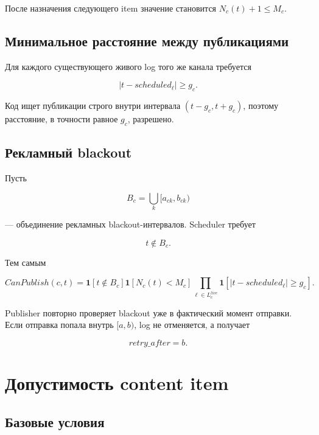 \documentclass[12pt,a4paper]{article}
\newcommand{\Ind}{\mathbf{1}}
\begin{document}
После назначения следующего item значение становится $N_c(t)+1\leq M_c$.

\subsection{Минимальное расстояние между публикациями}

Для каждого существующего живого log того же канала требуется

\begin{equation}
  |t-scheduled_\ell|\geq g_c.
  \label{eq:min-gap-constraint}
\end{equation}

Код ищет публикации строго внутри интервала $(t-g_c,t+g_c)$, поэтому расстояние,
в точности равное $g_c$, разрешено.

\subsection{Рекламный blackout}

Пусть

\begin{equation}
  B_c=\bigcup_{k}[a_{ck},b_{ck})
\end{equation}

--- объединение рекламных blackout-интервалов. Scheduler требует

\begin{equation}
  t\notin B_c.
  \label{eq:blackout-constraint}
\end{equation}

Тем самым

\begin{equation}
  CanPublish(c,t)=
  \Ind[t\notin B_c]
  \Ind[N_c(t)<M_c]
  \prod_{\ell\in L_c^{live}}
  \Ind[|t-scheduled_\ell|\geq g_c].
  \label{eq:can-publish}
\end{equation}

Publisher повторно проверяет blackout уже в фактический момент отправки. Если
отправка попала внутрь $[a,b)$, log не отменяется, а получает

\begin{equation}
  retry\_after=b.
\end{equation}

\section{Допустимость content item}

\subsection{Базовые условия}
\end{document}
